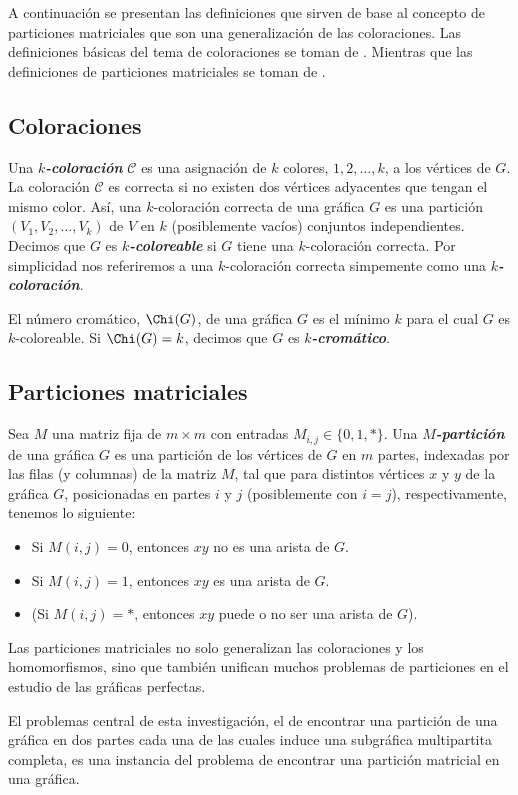 A continuación se presentan las definiciones que sirven de base al concepto de particiones matriciales que son una generalización de las coloraciones. Las definiciones básicas del tema de coloraciones se toman de \cite{Bondy}. Mientras que las definiciones de particiones matriciales se toman de \cite{Hell04}.

\subsection{Coloraciones}

Una \textbf{\emph{$k$-coloración}} $\mathcal{C}$ es una asignación de $k$ colores, $1,2,\dots,k$, a los vértices de $G$. La coloración $\mathcal{C}$ es correcta si no existen dos vértices adyacentes que tengan el mismo color. Así, una $k$-coloración correcta de una gráfica $G$ es una partición $(V_1, V_2, \dots, V_k)$ de $V$ en $k$ (posiblemente vacíos) conjuntos independientes. Decimos que $G$ es \textbf{\emph{$k$-coloreable}} si $G$ tiene una $k$-coloración correcta. Por simplicidad nos referiremos a una $k$-coloración correcta simpemente como una \textbf{\emph{$k$-coloración}}.

El número cromático, $\Chi(G)$, de una gráfica $G$ es el mínimo $k$ para el cual $G$ es $k$-coloreable. Si $\Chi(G) = k$, decimos que $G$ es \textbf{\emph{$k$-cromático}}.


\subsection{Particiones matriciales}

Sea $M$ una matriz fija de $m \times m$ con entradas $M_{i,j}\in \{0,1,*\}$. Una \textbf{\emph{$M$-partición}} de una gráfica $G$ es una partición de los vértices de $G$ en $m$ partes, indexadas por las filas (y columnas) de la matriz $M$, tal que para distintos vértices $x$ y $y$ de la gráfica $G$, posicionadas en partes $i$ y $j$ (posiblemente con $i = j$), respectivamente, tenemos lo siguiente:

\begin{itemize}
    \item Si $M(i,j) = 0$, entonces $xy$ no es una arista de $G$.
    \item Si $M(i,j) = 1$, entonces $xy$ es una arista de $G$.
    \item (Si $M(i,j) = *$, entonces $xy$ puede o no ser una arista de $G$).
\end{itemize}

Las particiones matriciales no solo generalizan las coloraciones y los homomorfismos, sino que también unifican muchos problemas de particiones en el estudio de las gráficas perfectas. 

El problemas central de esta investigación, el de encontrar una partición de una gráfica en dos partes cada una de las cuales induce una subgráfica multipartita completa, es una instancia del problema de encontrar una partición matricial en una gráfica. 